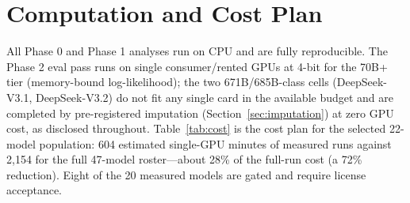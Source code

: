 \documentclass{ieeeaccess}
\theoremstyle{definition}
\theoremstyle{plain}
\begin{document}
\section{Computation and Cost Plan}
All Phase 0 and Phase 1 analyses run on CPU and are fully reproducible. The
Phase 2 eval pass runs on single consumer/rented GPUs at 4-bit for the 70B+
tier (memory-bound log-likelihood); the two 671B/685B-class cells
(DeepSeek-V3.1, DeepSeek-V3.2) do not fit any single card in the available
budget and are completed by pre-registered imputation (Section~\ref{sec:imputation})
at zero GPU cost, as disclosed throughout. Table~\ref{tab:cost}
is the cost plan for the selected 22-model population: 604 estimated
single-GPU minutes of measured runs against 2{,}154 for the full 47-model
roster---about 28\% of the full-run cost (a 72\% reduction). Eight of the 20
measured models are gated and require license acceptance.
\end{document}
